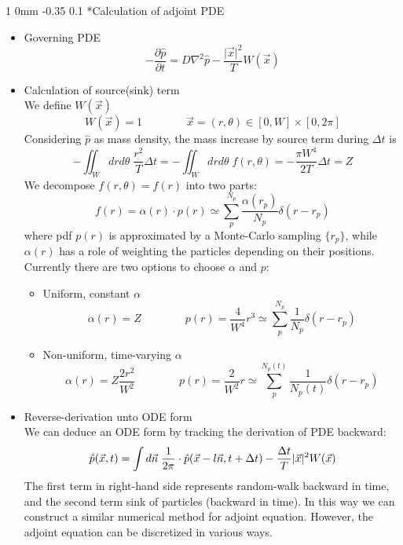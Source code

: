 \documentclass[11pt]{article}
\makeatletter
\renewcommand{\subsection}{\@startsection
{subsection}%
{1}%
{0mm}%
{-0.35\baselineskip}%
{0.1\baselineskip}%
{\normalfont\large\bfseries\color{brown}}}%
\def\Dpartial#1#2{ \frac{\partial #1}{\partial #2} }
\newcommand{\vn}{\vec{n}}
\newcommand{\vx}{\vec{x}}
\newcommand{\Dt}{\Delta t}
\newcommand{\ph}{\hat{p}}
\makeatother
\begin{document}
\subsection*{Calculation of adjoint PDE}
\begin{itemize}
\item Governing PDE
\begin{equation}
-\Dpartial{\hat{p}}{t} = D\nabla^2\hat{p} - \frac{\vert \vx\vert^2}{T}W(\vx)
\end{equation}
\item Calculation of source(sink) term\\
We define $W(\vx)$
\begin{equation}
W(\vx) = 1\qquad\qquad \vx = (r,\theta)\in[0,W]\times[0,2\pi]
\end{equation}
Considering $\hat{p}$ as mass density, the mass increase by source term during $\Dt$ is
\begin{equation*}
-\iint_W drd\theta\; \frac{r^2}{T}\Dt = -\iint_Wdrd\theta\;f(r,\theta) = -\frac{\pi W^4}{2T}\Dt = Z
\end{equation*}
We decompose $f(r,\theta)=f(r)$ into two parts:
\begin{equation}
f(r) = \alpha(r)\cdot p(r) \simeq \sum_p^{N_p} \frac{\alpha(r_p)}{N_p}\delta(r-r_p)
\end{equation}
where pdf $p(r)$ is approximated by a Monte-Carlo sampling $\{r_p\}$,
while $\alpha(r)$ has a role of weighting the particles depending on their positions.
Currently there are two options to choose $\alpha$ and $p$:
\begin{itemize}
\item Uniform, constant $\alpha$
\begin{equation*}
\alpha(r) = Z\qquad\qquad p(r) = \frac{4}{W^4}r^3\simeq\sum_p^{N_p}\frac{1}{N_p}\delta(r-r_p)
\end{equation*}
\item Non-uniform, time-varying $\alpha$
\begin{equation*}
\alpha(r) = Z\frac{2r^2}{W^2}\qquad\qquad p(r) = \frac{2}{W^2}r\simeq\sum_p^{N_p(t)}\frac{1}{N_p(t)}\delta(r-r_p)
\end{equation*}
\end{itemize}
\item Reverse-derivation unto ODE form\\
We can deduce an ODE form by tracking the derivation of PDE backward:
\begin{equation}
\ph(\vx,t) = \int d\vn\; \frac{1}{2\pi}\cdot \ph(\vx - l\vn, t+\Dt) - \frac{\Dt}{T}\vert\vx\vert^2W(\vx)\\
\end{equation}
The first term in right-hand side represents random-walk backward in time,
and the second term sink of particles (backward in time).
In this way we can construct a similar numerical method for adjoint equation.
However, the adjoint equation can be discretized in various ways.
\end{itemize}
\end{document}
